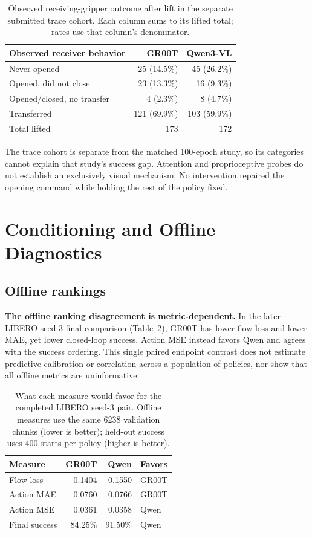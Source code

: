 \documentclass[conference]{IEEEtran}
\begin{document}
\begin{table}[t]
\centering\small\setlength{\tabcolsep}{4pt}
\caption{Observed receiving-gripper outcome after lift in the separate
submitted trace cohort. Each column sums to its lifted total; rates use
that column's denominator.}
\label{tab:failures}
\begin{tabular}{@{}lrr@{}}
\toprule
Observed receiver behavior & GR00T & Qwen3-VL \\
\midrule
Never opened & 25 (14.5\%) & 45 (26.2\%) \\
Opened, did not close & 23 (13.3\%) & 16 (9.3\%) \\
Opened/closed, no transfer & 4 (2.3\%) & 8 (4.7\%) \\
Transferred & 121 (69.9\%) & 103 (59.9\%) \\
\midrule
Total lifted & 173 & 172 \\
\bottomrule
\end{tabular}
\end{table}

The trace cohort is separate from the matched 100-epoch study, so its
categories cannot explain that study's success gap. Attention and
proprioceptive probes do not establish an exclusively visual mechanism.
No intervention repaired the opening command while holding the rest of
the policy fixed.

\section{Conditioning and Offline Diagnostics}
\subsection{Offline rankings}
\textbf{The offline ranking disagreement is metric-dependent.} In the later
LIBERO seed-3 final comparison (Table~\ref{tab:metrics}), GR00T has lower flow
loss and lower MAE, yet lower closed-loop success. Action MSE instead favors
Qwen and agrees with the success ordering. This single paired endpoint contrast
does not estimate predictive calibration or correlation across a population of
policies, nor show that all offline metrics are uninformative.

\begin{table}[t]
\centering\small\setlength{\tabcolsep}{3pt}
\caption{What each measure would favor for the completed LIBERO seed-3 pair.
Offline measures use the same 6238 validation chunks (lower is better);
held-out success uses 400 starts per policy (higher is better).}
\label{tab:metrics}
\begin{tabular}{@{}lrrl@{}}\toprule
Measure & GR00T & Qwen & Favors\\\midrule
Flow loss & 0.1404 & 0.1550 & GR00T\\
Action MAE & 0.0760 & 0.0766 & GR00T\\
Action MSE & 0.0361 & 0.0358 & Qwen\\
\midrule
Final success & 84.25\% & 91.50\% & Qwen\\\bottomrule
\end{tabular}
\end{table}
\end{document}
